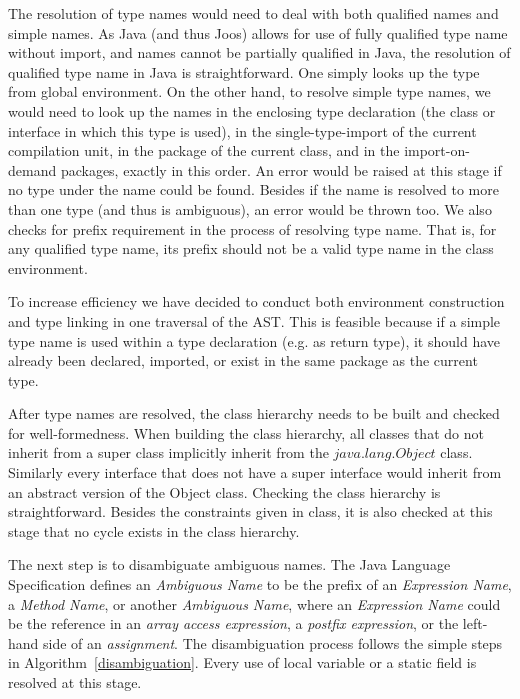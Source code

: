 \documentclass[a4paper, notitlepage]{report}
\begin{document}
The resolution of type names would need to deal with both qualified names and simple names. As Java (and thus Joos) allows for use of fully qualified type name without import, and names cannot be partially qualified in Java, the resolution of qualified type name in Java is straightforward. One simply looks up the type from global environment. On the other hand, to resolve simple type names, we would need to look up the names in the enclosing type declaration (the class or interface in which this type is used), in the single-type-import of the current compilation unit, in the package of the current class, and in the import-on-demand packages, exactly in this order. An error would be raised at this stage if no type under the name could be found. Besides if the name is resolved to more than one type (and thus is ambiguous), an error would be thrown too. We also checks for prefix requirement in the process of resolving type name. That is, for any qualified type name, its prefix should not be a valid type name in the class environment.

To increase efficiency we have decided to conduct both environment construction and type linking in one traversal of the AST. This is feasible because if a simple type name is used within a type declaration (e.g. as return type), it should have already been declared, imported, or exist in the same package as the current type. 

After type names are resolved, the class hierarchy needs to be built and checked for well-formedness. When building the class hierarchy, all classes that do not inherit from a super class implicitly inherit from the $java.lang.Object$ class. Similarly every interface that does not have a super interface would inherit from an abstract version of the Object class. Checking the class hierarchy is straightforward. Besides the constraints given in class, it is also checked at this stage that no cycle exists in the class hierarchy.

The next step is to disambiguate ambiguous names. The Java Language Specification defines an \emph{Ambiguous Name} to be the prefix of an \emph{Expression Name}, a \emph{Method Name}, or another \emph{Ambiguous Name}, where an \emph{Expression Name} could be the reference in an \emph{array access expression}, a \emph{postfix expression}, or the left-hand side of an \emph{assignment}. The disambiguation process follows the simple steps in Algorithm~\ref{disambiguation}. Every use of local variable or a static field is resolved at this stage.
\end{document}
